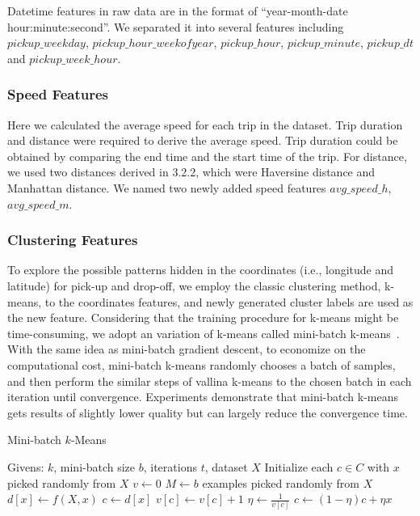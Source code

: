 Datetime features in raw data are  in the format of “year-month-date hour:minute:second”. We separated it into several features including $pickup\_weekday$, $pickup\_hour\_weekofyear$, $pickup\_hour$, $pickup\_minute$, $pickup\_dt$ and $pickup\_week\_hour$.

\subsubsection{Speed Features}
Here we calculated the average speed for each trip in the dataset. Trip duration and distance were required to derive the average speed. Trip duration could be obtained by comparing the end time and the start time of the trip. For distance, we used two distances derived in 3.2.2, which were Haversine distance and Manhattan distance. We named two newly added speed features $avg\_speed\_h$, $avg\_speed\_m$. 

\subsubsection{Clustering Features}
To explore the possible patterns hidden in the coordinates (i.e., longitude and latitude) for pick-up and drop-off, we employ the classic clustering method, k-means, to the coordinates features, and newly generated cluster labels are used as the new feature.
Considering that the training procedure for k-means might be time-consuming, we adopt an variation of k-means called mini-batch k-means~\cite{sculley2010web}. With the same idea as mini-batch gradient descent, to economize on the computational cost, mini-batch k-means randomly chooses a batch of samples, and then perform the similar steps of vallina k-means to the chosen batch in each iteration until convergence. Experiments \cite{sculley2010web} demonstrate that mini-batch k-means  gets results of slightly lower quality but can largely reduce the convergence time.

\begin{algorithm}
	\caption{Mini-batch $k$-Means}
	\begin{algorithmic}[1]
	\State Givens: $k$, mini-batch size $b$, iterations $t$, dataset $X$ 
	\State Initialize each $c \in C$ with $x$ picked randomly from $X$
	\State $v \gets 0$
	\State $M \gets b$ examples picked randomly from $X$
	\State $d[x] \gets f(X,x)$
	\EndFor
	\State $c \gets d[x]$
	\State $v[c] \gets v[c] + 1$
	\State $\eta \gets \frac{1}{v[c]}$
	\State $c \gets (1-\eta)c+\eta x$
	\EndFor
	\EndFor
	\end{algorithmic}
\end{algorithm}

